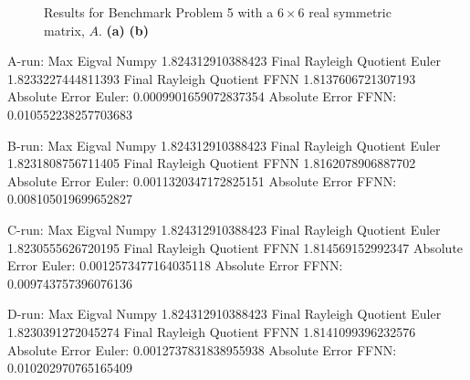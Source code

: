 \begin{figure}[H]
\qquad
{}
\caption{Results for Benchmark Problem 5 with a $6\times 6$ real symmetric matrix, $A$. \textbf{(a)}  \textbf{(b)} }
\label{fig:benchrun5}
\end{figure}


A-run:
Max Eigval Numpy 1.824312910388423
Final Rayleigh Quotient Euler 1.8233227444811393
Final Rayleigh Quotient FFNN 1.8137606721307193
Absolute Error Euler: 0.0009901659072837354
Absolute Error FFNN: 0.010552238257703683

B-run:
Max Eigval Numpy 1.824312910388423
Final Rayleigh Quotient Euler 1.8231808756711405
Final Rayleigh Quotient FFNN 1.8162078906887702
Absolute Error Euler: 0.0011320347172825151
Absolute Error FFNN: 0.008105019699652827

C-run:
Max Eigval Numpy 1.824312910388423
Final Rayleigh Quotient Euler 1.8230555626720195
Final Rayleigh Quotient FFNN 1.814569152992347
Absolute Error Euler: 0.0012573477164035118
Absolute Error FFNN: 0.009743757396076136

D-run:
Max Eigval Numpy 1.824312910388423
Final Rayleigh Quotient Euler 1.8230391272045274
Final Rayleigh Quotient FFNN 1.8141099396232576
Absolute Error Euler: 0.0012737831838955938
Absolute Error FFNN: 0.010202970765165409






